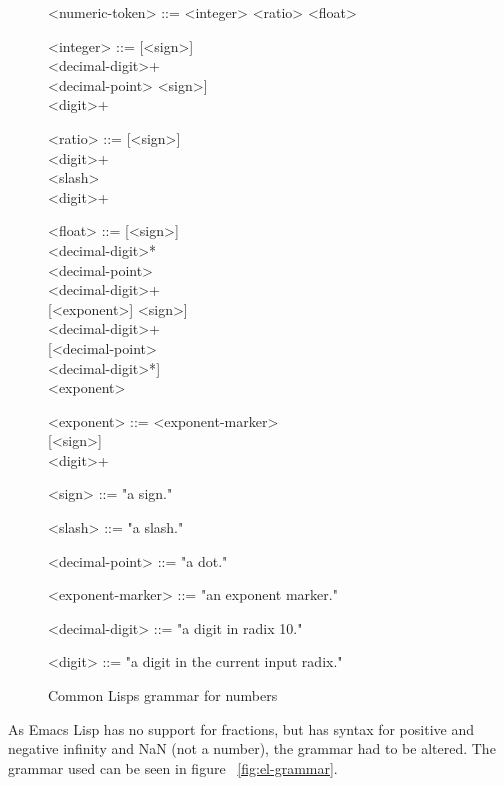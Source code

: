 \documentclass[a4paper,10pt,twoside]{report}
\newcommand{\el}{Emacs Lisp}
\newcommand{\cl}{Common Lisp}
\begin{document}
\begin{figure}
  \begin{grammar}
    <numeric-token> ::= <integer> \alt <ratio> \alt <float>
  
    <integer> ::= {[}<sign>{]} \\
    <decimal-digit>+ \\
    <decimal-point>
    \alt {[}<sign>{]} \\
    <digit>+

    <ratio> ::= {[}<sign>{]} \\
    <digit>+ \\
    <slash> \\
    <digit>+
  
    <float> ::= {[}<sign>{]} \\
    <decimal-digit>* \\
    <decimal-point> \\
    <decimal-digit>+ \\
    {[}<exponent>{]}
    \alt {[}<sign>{]} \\
    <decimal-digit>+ \\
    {[}<decimal-point> \\
    <decimal-digit>*{]} \\
    <exponent>
  
    <exponent> ::= <exponent-marker> \\
    {[}<sign>{]} \\
    <digit>+
                                       
    <sign> ::= "a sign."
  
    <slash> ::= "a slash."
  
    <decimal-point> ::= "a dot."
  
    <exponent-marker> ::= "an exponent marker."
  
    <decimal-digit> ::= "a digit in radix 10."
  
    <digit> ::= "a digit in the current input radix."
  \end{grammar}
  
  \caption{\cl{}s grammar for numbers}
  \label{fig:cl-grammar}
\end{figure}
As \el{} has no support for fractions, but has syntax for positive and negative
infinity and NaN (not a number), the grammar had to be altered.  The grammar
used can be seen in figure ~\ref{fig:el-grammar}.
\end{document}
